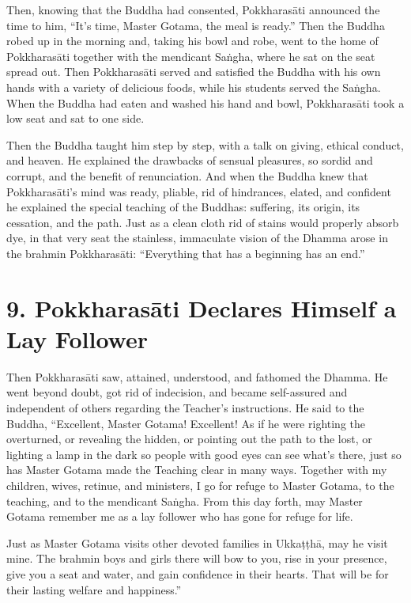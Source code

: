 \documentclass[12pt,openany]{book}%
\begin{document}
Then, knowing that the Buddha had consented, \textsanskrit{Pokkharasāti} announced the time to him, “It’s time, Master Gotama, the meal is ready.” Then the Buddha robed up in the morning and, taking his bowl and robe, went to the home of \textsanskrit{Pokkharasāti} together with the mendicant \textsanskrit{Saṅgha}, where he sat on the seat spread out. Then \textsanskrit{Pokkharasāti} served and satisfied the Buddha with his own hands with a variety of delicious foods, while his students served the \textsanskrit{Saṅgha}. When the Buddha had eaten and washed his hand and bowl, \textsanskrit{Pokkharasāti} took a low seat and sat to one side. 

Then the Buddha taught him step by step, with a talk on giving, ethical conduct, and heaven. He explained the drawbacks of sensual pleasures, so sordid and corrupt, and the benefit of renunciation. And when the Buddha knew that \textsanskrit{Pokkharasāti}’s mind was ready, pliable, rid of hindrances, elated, and confident he explained the special teaching of the Buddhas: suffering, its origin, its cessation, and the path. Just as a clean cloth rid of stains would properly absorb dye, in that very seat the stainless, immaculate vision of the Dhamma arose in the brahmin \textsanskrit{Pokkharasāti}: “Everything that has a beginning has an end.” 

\section*{9. \textsanskrit{Pokkharasāti} Declares Himself a Lay Follower }

Then \textsanskrit{Pokkharasāti} saw, attained, understood, and fathomed the Dhamma. He went beyond doubt, got rid of indecision, and became self-assured and independent of others regarding the Teacher’s instructions. He said to the Buddha, “Excellent, Master Gotama! Excellent! As if he were righting the overturned, or revealing the hidden, or pointing out the path to the lost, or lighting a lamp in the dark so people with good eyes can see what’s there, just so has Master Gotama made the Teaching clear in many ways. Together with my children, wives, retinue, and ministers, I go for refuge to Master Gotama, to the teaching, and to the mendicant \textsanskrit{Saṅgha}. From this day forth, may Master Gotama remember me as a lay follower who has gone for refuge for life. 

Just as Master Gotama visits other devoted families in \textsanskrit{Ukkaṭṭhā}, may he visit mine. The brahmin boys and girls there will bow to you, rise in your presence, give you a seat and water, and gain confidence in their hearts. That will be for their lasting welfare and happiness.” 
\end{document}

